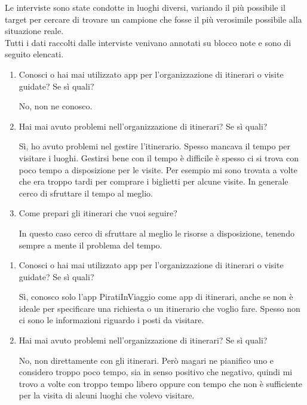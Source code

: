 Le interviste sono state condotte in luoghi diversi, variando il più possibile il target per cercare di trovare un campione che fosse il più verosimile possibile alla situazione reale. \\
Tutti i dati raccolti dalle interviste venivano annotati su blocco note e sono di seguito elencati.



\begin{enumerate}

\item Conosci o hai mai utilizzato app per l'organizzazione di itinerari o visite guidate? Se sì quali?

No, non ne conosco.

\item Hai mai avuto problemi nell'organizzazione di itinerari? Se sì quali?

Sì, ho avuto problemi nel gestire l'itinerario. Spesso mancava il tempo per visitare i luoghi. Gestirsi bene con il tempo è difficile è spesso ci si trova con poco tempo a disposizione per le visite. Per esempio mi sono trovata a volte che era troppo tardi per comprare i biglietti per alcune visite. In generale cerco di sfruttare il tempo al meglio.

\item Come prepari gli itinerari che vuoi seguire?

In questo caso cerco di sfruttare al meglio le risorse a disposizione, tenendo sempre a mente il problema del tempo.

\end{enumerate}


\begin{enumerate}

\item Conosci o hai mai utilizzato app per l'organizzazione di itinerari o visite guidate? Se sì quali?

Sì, conosco solo l'app PiratiInViaggio come app di itinerari, anche se non è ideale per specificare una richiesta o un itinerario che voglio fare. Spesso non ci sono le informazioni riguardo i posti da visitare. 

\item Hai mai avuto problemi nell'organizzazione di itinerari? Se sì quali?

No, non direttamente con gli itinerari. Però magari ne pianifico uno e considero troppo poco tempo, sia in senso positivo che negativo, quindi mi trovo a volte con troppo tempo libero oppure con tempo che non è sufficiente per la visita di alcuni luoghi che volevo visitare.

\end{enumerate}

